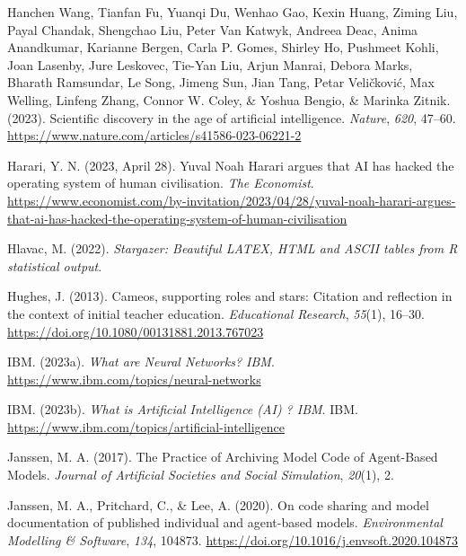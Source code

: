 \documentclass[
  letterpaper,
  DIV=11,
  numbers=noendperiod]{scrreprt}
\newlength{\cslhangindent}
\newlength{\cslentryspacingunit} %
\newenvironment{CSLReferences}[2] %
 {%
  \setlength{\parindent}{0pt}
  \ifodd #1
  \let\oldpar\par
  \def\par{\hangindent=\cslhangindent\oldpar}
  \fi
  \setlength{\parskip}{#2\cslentryspacingunit}
 }%
 {}
\begin{document}
\begin{CSLReferences}{1}{0}
\leavevmode{}%
Hanchen Wang, Tianfan Fu, Yuanqi Du, Wenhao Gao, Kexin Huang, Ziming
Liu, Payal Chandak, Shengchao Liu, Peter Van Katwyk, Andreea Deac, Anima
Anandkumar, Karianne Bergen, Carla P. Gomes, Shirley Ho, Pushmeet Kohli,
Joan Lasenby, Jure Leskovec, Tie-Yan Liu, Arjun Manrai, Debora Marks,
Bharath Ramsundar, Le Song, Jimeng Sun, Jian Tang, Petar Veličković, Max
Welling, Linfeng Zhang, Connor W. Coley, \& Yoshua Bengio, \& Marinka
Zitnik. (2023). Scientific discovery in the age of artificial
intelligence. \emph{Nature}, \emph{620}, 47--60.
\url{https://www.nature.com/articles/s41586-023-06221-2}

\leavevmode{}%
Harari, Y. N. (2023, April 28). Yuval {Noah Harari} argues that {AI} has
hacked the operating system of human civilisation. \emph{The Economist}.
\url{https://www.economist.com/by-invitation/2023/04/28/yuval-noah-harari-argues-that-ai-has-hacked-the-operating-system-of-human-civilisation}

\leavevmode{}%
Hlavac, M. (2022). \emph{Stargazer: Beautiful {LATEX}, {HTML} and
{ASCII} tables from {R} statistical output}.

\leavevmode{}%
Hughes, J. (2013). Cameos, supporting roles and stars: Citation and
reflection in the context of initial teacher education.
\emph{Educational Research}, \emph{55}(1), 16--30.
\url{https://doi.org/10.1080/00131881.2013.767023}

\leavevmode{}%
IBM. (2023a). \emph{What are {Neural Networks}? \textbar{} {IBM}}.
\url{https://www.ibm.com/topics/neural-networks}

\leavevmode{}%
IBM. (2023b). \emph{What is {Artificial Intelligence} ({AI}) ?
\textbar{} {IBM}}. IBM.
\url{https://www.ibm.com/topics/artificial-intelligence}

\leavevmode{}%
Janssen, M. A. (2017). The {Practice} of {Archiving Model Code} of
{Agent-Based Models}. \emph{Journal of Artificial Societies and Social
Simulation}, \emph{20}(1), 2.

\leavevmode{}%
Janssen, M. A., Pritchard, C., \& Lee, A. (2020). On code sharing and
model documentation of published individual and agent-based models.
\emph{Environmental Modelling \& Software}, \emph{134}, 104873.
\url{https://doi.org/10.1016/j.envsoft.2020.104873}


\end{CSLReferences}
\end{document}
